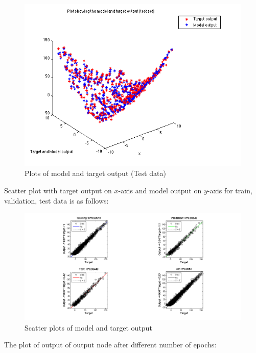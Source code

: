 \documentclass{article}
\begin{document}
\begin{figure}[H]
\centering
\includegraphics[width=0.5\linewidth]{Regression/bivariate/output_2layer_test.png}
\caption{Plots of model and target output (Test data)}
\end{figure}

Scatter plot with target output on $x$-axis and model output on $y$-axis for train, validation, test data is as follows:

\begin{figure}[H]
\centering
\includegraphics[width=1.2\linewidth]{Regression/bivariate/scatter_2layers.png}
\caption{Scatter plots of model and target output}
\end{figure}

The plot of output of output node after different number of epochs:
\end{document}
